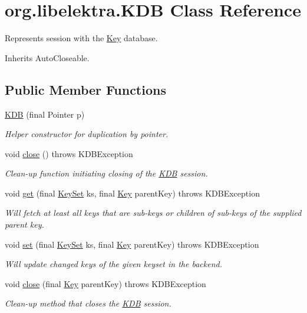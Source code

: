 \hypertarget{classorg_1_1libelektra_1_1KDB}{}\section{org.\+libelektra.\+K\+DB Class Reference}
\label{classorg_1_1libelektra_1_1KDB}


Represents session with the \hyperlink{classorg_1_1libelektra_1_1Key}{Key} database.  




Inherits Auto\+Closeable.

\subsection*{Public Member Functions}
\begin{DoxyCompactItemize}
\item 
\hyperlink{classorg_1_1libelektra_1_1KDB_a256255ad383403a2efe699c4ccc4fe12}{K\+DB} (final Pointer p)
\begin{DoxyCompactList}\small\item\em Helper constructor for duplication by pointer. \end{DoxyCompactList}\item 
void \hyperlink{classorg_1_1libelektra_1_1KDB_ad3dcc3e348d1c841c7eda0bb00c54167}{close} ()  throws K\+D\+B\+Exception 	
\begin{DoxyCompactList}\small\item\em Clean-\/up function initiating closing of the \hyperlink{classorg_1_1libelektra_1_1KDB}{K\+DB} session. \end{DoxyCompactList}\item 
void \hyperlink{classorg_1_1libelektra_1_1KDB_ac3b5b3551a9fef5dae1fb468e74272f6}{get} (final \hyperlink{classorg_1_1libelektra_1_1KeySet}{Key\+Set} ks, final \hyperlink{classorg_1_1libelektra_1_1Key}{Key} parent\+Key)  throws K\+D\+B\+Exception 	
\begin{DoxyCompactList}\small\item\em Will fetch at least all keys that are sub-\/keys or children of sub-\/keys of the supplied parent key. \end{DoxyCompactList}\item 
void \hyperlink{classorg_1_1libelektra_1_1KDB_a4e7f86ca77f654bb11a38cdf6db6383f}{set} (final \hyperlink{classorg_1_1libelektra_1_1KeySet}{Key\+Set} ks, final \hyperlink{classorg_1_1libelektra_1_1Key}{Key} parent\+Key)  throws K\+D\+B\+Exception 	
\begin{DoxyCompactList}\small\item\em Will update changed keys of the given keyset in the backend. \end{DoxyCompactList}\item 
void \hyperlink{classorg_1_1libelektra_1_1KDB_af6b472eadf78ba4ed216303b52ddb29e}{close} (final \hyperlink{classorg_1_1libelektra_1_1Key}{Key} parent\+Key)  throws K\+D\+B\+Exception 	
\begin{DoxyCompactList}\small\item\em Clean-\/up method that closes the \hyperlink{classorg_1_1libelektra_1_1KDB}{K\+DB} session. \end{DoxyCompactList}\end{DoxyCompactItemize}
